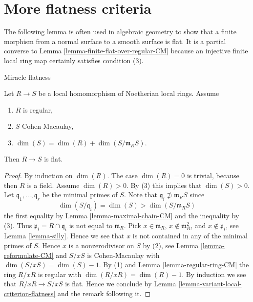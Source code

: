 \section{More flatness criteria}
\label{section-more-flatness-criteria}

\noindent
The following lemma is often used in algebraic geometry to show that a finite
morphism from a normal surface to a smooth surface is flat. It is a partial
converse to
Lemma \ref{lemma-finite-flat-over-regular-CM}
because an injective finite local ring map certainly satisfies condition (3).

\begin{lemma}
\label{lemma-CM-over-regular-flat}
\begin{slogan}
Miracle flatness
\end{slogan}
Let $R \to S$ be a local homomorphism of Noetherian local
rings. Assume
\begin{enumerate}
\item $R$ is regular,
\item $S$ Cohen-Macaulay,
\item $\dim(S) = \dim(R) + \dim(S/\mathfrak m_R S)$.
\end{enumerate}
Then $R \to S$ is flat.
\end{lemma}

\begin{proof}
By induction on $\dim(R)$. The case $\dim(R) = 0$ is trivial, because
then $R$ is a field. Assume $\dim(R) > 0$. By (3) this implies that
$\dim(S) > 0$. Let $\mathfrak q_1, \ldots, \mathfrak q_r$ be the minimal
primes of $S$. Note that $\mathfrak q_i \not \supset \mathfrak m_R S$ since
$$
\dim(S/\mathfrak q_i) = \dim(S) > \dim(S/\mathfrak m_R S)
$$
the first equality by Lemma \ref{lemma-maximal-chain-CM} and the
inequality by (3). Thus
$\mathfrak p_i = R \cap \mathfrak q_i$ is not equal to $\mathfrak m_R$.
Pick $x \in \mathfrak m_R$, $x \not \in \mathfrak m_R^2$, and
$x \not \in \mathfrak p_i$, see
Lemma \ref{lemma-silly}.
Hence we see that $x$ is not contained in any of the minimal
primes of $S$. Hence $x$ is a nonzerodivisor on $S$ by (2), see
Lemma \ref{lemma-reformulate-CM} and
$S/xS$ is Cohen-Macaulay with $\dim(S/xS) = \dim(S) - 1$.
By (1) and Lemma \ref{lemma-regular-ring-CM} the ring $R/xR$ is regular
with $\dim(R/xR) = \dim(R) - 1$.
By induction we see that $R/xR \to S/xS$ is flat. Hence we
conclude by Lemma \ref{lemma-variant-local-criterion-flatness}
and the remark following it.
\end{proof}

